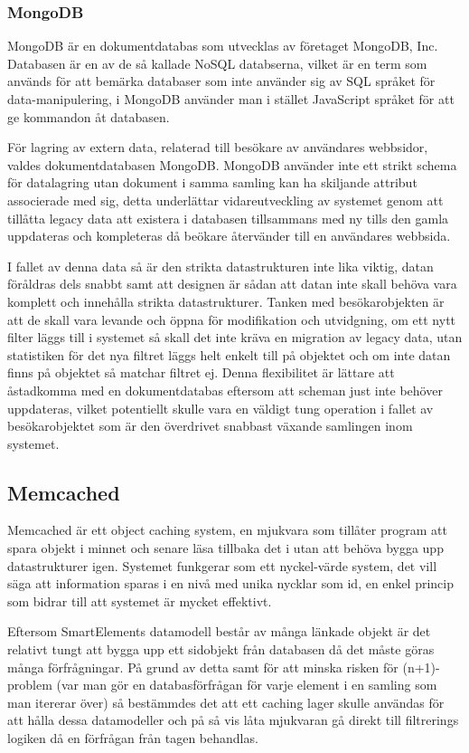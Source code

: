 \subsubsection{MongoDB}

MongoDB är en dokumentdatabas som utvecklas av företaget MongoDB, Inc. Databasen är en av de så kallade NoSQL databserna, vilket är en term som används för att bemärka databaser som inte använder sig av SQL språket för data-manipulering, i MongoDB använder man i stället JavaScript språket för att ge kommandon åt databasen.

För lagring av extern data, relaterad till besökare av användares webbsidor, valdes dokumentdatabasen MongoDB. MongoDB använder inte ett strikt schema för datalagring utan dokument i samma samling kan ha skiljande attribut associerade med sig, detta underlättar vidareutveckling av systemet genom att tillåtta legacy data att existera i databasen tillsammans med ny tills den gamla uppdateras och kompleteras då beökare återvänder till en användares webbsida.

I fallet av denna data så är den strikta datastrukturen inte lika viktig, datan föråldras dels snabbt samt att designen är sådan att datan inte skall behöva vara komplett och innehålla strikta datastrukturer. Tanken med besökarobjekten är att de skall vara levande och öppna för modifikation och utvidgning, om ett nytt filter läggs till i systemet så skall det inte kräva en migration av legacy data, utan statistiken för det nya filtret läggs helt enkelt till på objektet och om inte datan finns på objektet så matchar filtret ej. Denna flexibilitet är lättare att åstadkomma med en dokumentdatabas eftersom att scheman just inte behöver uppdateras, vilket potentiellt skulle vara en väldigt tung operation i fallet av besökarobjektet som är den överdrivet snabbast växande samlingen inom systemet.

\subsection{Memcached}

Memcached är ett object caching system, en mjukvara som tillåter program att spara objekt i minnet och senare läsa tillbaka det i utan att behöva bygga upp datastrukturer igen. Systemet funkgerar som ett nyckel-värde system, det vill säga att information sparas i en nivå med unika nycklar som id, en enkel princip som bidrar till att systemet är mycket effektivt. \citep{memcachedwiki}

Eftersom SmartElements datamodell består av många länkade objekt är det relativt tungt att bygga upp ett sidobjekt från databasen då det måste göras många förfrågningar. På grund av detta samt för att minska risken för (n+1)-problem (var man gör en databasförfrågan för varje element i en samling som man itererar över) så bestämmdes det att ett caching lager skulle användas för att hålla dessa datamodeller och på så vis låta mjukvaran gå direkt till filtrerings logiken då en förfrågan från tagen behandlas.

